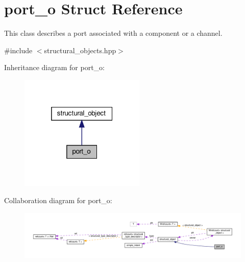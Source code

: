 \hypertarget{structport__o}{}\section{port\+\_\+o Struct Reference}
\label{structport__o}


This class describes a port associated with a component or a channel.  




{\ttfamily \#include $<$structural\+\_\+objects.\+hpp$>$}



Inheritance diagram for port\+\_\+o\+:
\nopagebreak
\begin{figure}[H]
\begin{center}
\leavevmode
\includegraphics[width=169pt]{d2/df7/structport__o__inherit__graph}
\end{center}
\end{figure}


Collaboration diagram for port\+\_\+o\+:
\nopagebreak
\begin{figure}[H]
\begin{center}
\leavevmode
\includegraphics[width=350pt]{d2/db2/structport__o__coll__graph}
\end{center}
\end{figure}

